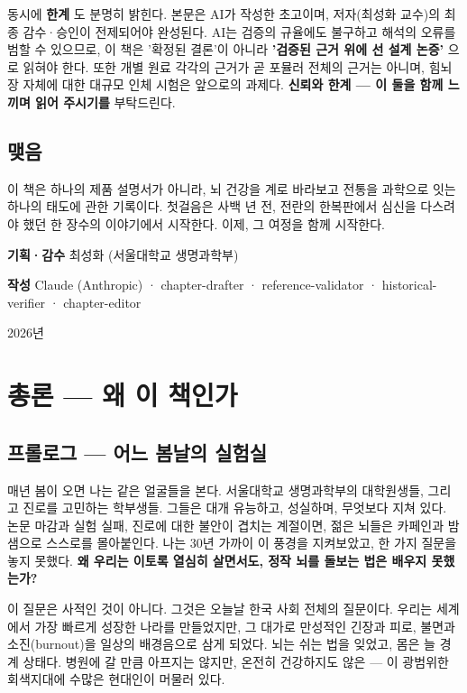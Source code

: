 \documentclass[11pt,oneside]{book}
\begin{document}
동시에 \textbf{한계} 도 분명히 밝힌다. 본문은 AI가 작성한 초고이며, 저자(최성화 교수)의 최종 감수·승인이 전제되어야 완성된다. AI는 검증의 규율에도 불구하고 해석의 오류를 범할 수 있으므로, 이 책은 '확정된 결론'이 아니라 \textbf{'검증된 근거 위에 선 설계 논증'} 으로 읽혀야 한다. 또한 개별 원료 각각의 근거가 곧 포뮬러 전체의 근거는 아니며, 힘뇌장 자체에 대한 대규모 인체 시험은 앞으로의 과제다. \textbf{신뢰와 한계 — 이 둘을 함께 느끼며 읽어 주시기를} 부탁드린다.

\section{맺음}
이 책은 하나의 제품 설명서가 아니라, 뇌 건강을 계로 바라보고 전통을 과학으로 잇는 하나의 태도에 관한 기록이다. 첫걸음은 사백 년 전, 전란의 한복판에서 심신을 다스려야 했던 한 장수의 이야기에서 시작한다. 이제, 그 여정을 함께 시작한다.

\textbf{기획·감수} 최성화 (서울대학교 생명과학부)

\textbf{작성} Claude (Anthropic) · chapter-drafter · reference-validator · historical-verifier · chapter-editor

2026년


\clearpage
\tableofcontents
\clearpage

\mainmatter
\pagestyle{fancy}



\chapter{총론 — 왜 이 책인가}

\section{프롤로그 — 어느 봄날의 실험실}
매년 봄이 오면 나는 같은 얼굴들을 본다. 서울대학교 생명과학부의 대학원생들, 그리고 진로를 고민하는 학부생들. 그들은 대개 유능하고, 성실하며, 무엇보다 지쳐 있다. 논문 마감과 실험 실패, 진로에 대한 불안이 겹치는 계절이면, 젊은 뇌들은 카페인과 밤샘으로 스스로를 몰아붙인다. 나는 30년 가까이 이 풍경을 지켜보았고, 한 가지 질문을 놓지 못했다. \textbf{왜 우리는 이토록 열심히 살면서도, 정작 뇌를 돌보는 법은 배우지 못했는가?}

이 질문은 사적인 것이 아니다. 그것은 오늘날 한국 사회 전체의 질문이다. 우리는 세계에서 가장 빠르게 성장한 나라를 만들었지만, 그 대가로 만성적인 긴장과 피로, 불면과 소진(burnout)을 일상의 배경음으로 삼게 되었다. 뇌는 쉬는 법을 잊었고, 몸은 늘 경계 상태다. 병원에 갈 만큼 아프지는 않지만, 온전히 건강하지도 않은 — 이 광범위한 회색지대에 수많은 현대인이 머물러 있다.
\end{document}
